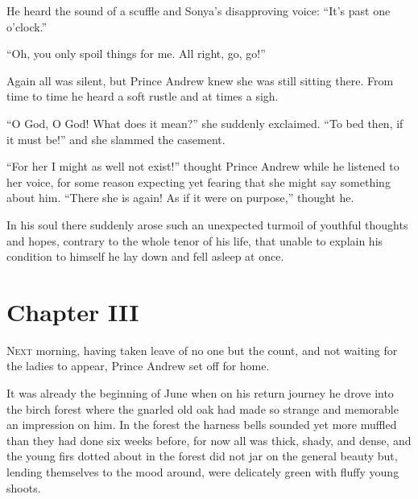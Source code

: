 He heard the sound of a scuffle and Sonya's disapproving voice:
``It's past one o'clock.''

``Oh, you only spoil things for me. All right, go, go!''

Again all was silent, but Prince Andrew knew she was still
sitting there. From time to time he heard a soft rustle and at
times a sigh.

``O God, O God! What does it mean?'' she suddenly exclaimed. ``To
bed then, if it must be!'' and she slammed the casement.

``For her I might as well not exist!'' thought Prince Andrew
while he listened to her voice, for some reason expecting yet
fearing that she might say something about him. ``There she is
again! As if it were on purpose,'' thought he.

In his soul there suddenly arose such an unexpected turmoil of
youthful thoughts and hopes, contrary to the whole tenor of his
life, that unable to explain his condition to himself he lay down
and fell asleep at once.


\chapter*{Chapter III}
\ifaudio     
{} 
\fi

\lettrine[lines=2, loversize=0.3, lraise=0]{\initfamily N}{ext}
morning, having taken leave of no one but the count, and not
waiting for the ladies to appear, Prince Andrew set off for home.

It was already the beginning of June when on his return journey
he drove into the birch forest where the gnarled old oak had made
so strange and memorable an impression on him. In the forest the
harness bells sounded yet more muffled than they had done six
weeks before, for now all was thick, shady, and dense, and the
young firs dotted about in the forest did not jar on the general
beauty but, lending themselves to the mood around, were
delicately green with fluffy young shoots.


